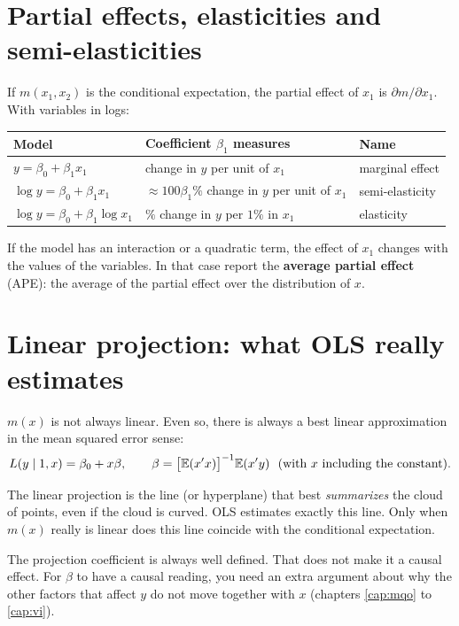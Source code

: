 \section{Partial effects, elasticities and semi-elasticities}
If $m(x_1,x_2)$ is the conditional expectation, the partial effect of $x_1$ is $\partial m/\partial x_1$. With variables in logs:
\begin{center}
\small
\begin{tabular}{lll}
\toprule
\textbf{Model} & \textbf{Coefficient $\beta_1$ measures} & \textbf{Name} \\
\midrule
$y=\beta_0+\beta_1x_1$ & change in $y$ per unit of $x_1$ & marginal effect \\
$\log y=\beta_0+\beta_1 x_1$ & $\approx 100\beta_1\%$ change in $y$ per unit of $x_1$ & semi-elasticity \\
$\log y=\beta_0+\beta_1\log x_1$ & $\%$ change in $y$ per $1\%$ in $x_1$ & elasticity \\
\bottomrule
\end{tabular}
\end{center}
If the model has an interaction or a quadratic term, the effect of $x_1$ changes with the values of the variables. In that case report the \textbf{average partial effect} (APE): the average of the partial effect over the distribution of $x$.

\section{Linear projection: what OLS really estimates}
$m(x)$ is not always linear. Even so, there is always a best linear approximation in the mean squared error sense:
\[
L(y\mid 1,x)=\beta_0+x\beta,\qquad \beta=\big[\mathbb{E}(x'x)\big]^{-1}\mathbb{E}(x'y)\ \ (\text{with } x \text{ including the constant}).
\]
\begin{intuicao}
The linear projection is the line (or hyperplane) that best \emph{summarizes} the cloud of points, even if the cloud is curved. OLS estimates exactly this line. Only when $m(x)$ really is linear does this line coincide with the conditional expectation.
\end{intuicao}

\begin{atencao}
The projection coefficient is always well defined. That does not make it a causal effect. For $\beta$ to have a causal reading, you need an extra argument about why the other factors that affect $y$ do not move together with $x$ (chapters \ref{cap:mqo} to \ref{cap:vi}).
\end{atencao}


